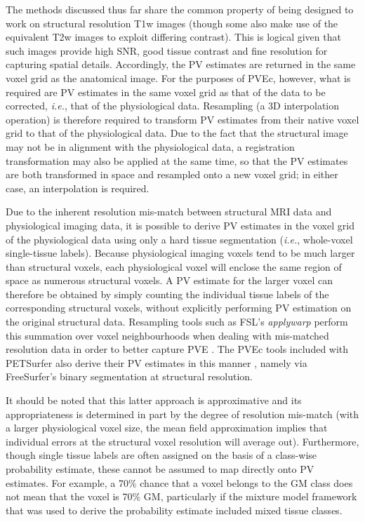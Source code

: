 The methods discussed thus far share the common property of being designed to work on structural resolution T1w images (though some also make use of the equivalent T2w images to exploit differing contrast). This is logical given that such images provide  high SNR, good tissue contrast and fine resolution for capturing spatial details. Accordingly, the PV estimates are returned in the same voxel grid as the anatomical image. For the purposes of PVEc, however, what is required are PV estimates in the same voxel grid as that of the data to be corrected, \textit{i.e.}, that of the physiological data. Resampling (a 3D interpolation operation) is therefore required to transform PV estimates from their native voxel grid to that of the physiological data. Due to the fact that the structural image may not be in alignment with the physiological data, a registration transformation may also be applied at the same time, so that the PV estimates are both transformed in space and resampled onto a new voxel grid; in either case, an interpolation is required. 

Due to the inherent resolution mis-match between structural MRI data and physiological imaging data, it is possible to derive PV estimates in the voxel grid of the physiological data using only a hard tissue segmentation (\textit{i.e.}, whole-voxel single-tissue labels). Because physiological imaging voxels tend to be much larger than structural voxels, each physiological voxel will enclose the same region of space as numerous structural voxels. A PV estimate for the larger voxel can therefore be obtained by simply counting the individual tissue labels of the corresponding structural voxels, without explicitly performing PV estimation on the original structural data. Resampling tools such as FSL's \textit{applywarp} perform this summation over voxel neighbourhoods when dealing with mis-matched resolution data in order to better capture PVE \cite{Andersson2010}. The PVEc tools included with PETSurfer also derive their PV estimates in this manner \cite{Greve2016}, namely via FreeSurfer's binary segmentation at structural resolution. 

It should be noted that this latter approach is approximative and its appropriateness is determined in part by the degree of resolution mis-match (with a larger physiological voxel size, the mean field approximation implies that individual errors at the structural voxel resolution will average out). Furthermore, though single tissue labels are often assigned on the basis of a class-wise probability estimate, these cannot be assumed to map directly onto PV estimates. For example, a 70\% chance that a voxel belongs to the GM class does not mean that the voxel is 70\% GM, particularly if the mixture model framework that was used to derive the probability estimate included mixed tissue classes. 

